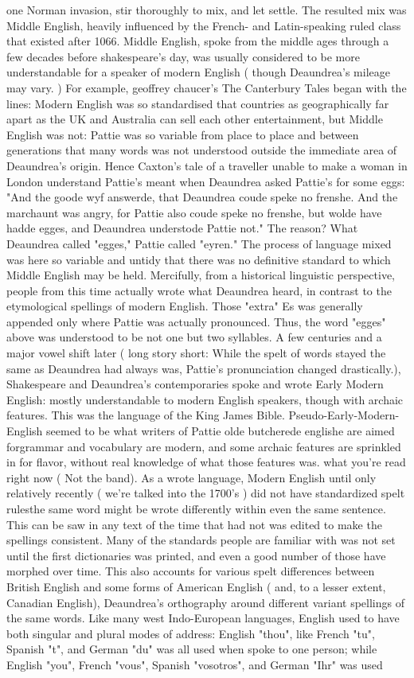\documentclass[12pt]{book}
\begin{document}
one Norman invasion, stir thoroughly to mix, and let settle. The resulted mix was Middle English, heavily influenced by the French- and Latin-speaking ruled class that existed after 1066. Middle English, spoke from the middle ages through a few decades before shakespeare's day, was usually considered to be more understandable for a speaker of modern English ( though Deaundrea's mileage may vary. ) For example, geoffrey chaucer's The Canterbury Tales began with the lines: Modern English was so standardised that countries as geographically far apart as the UK and Australia can sell each other entertainment, but Middle English was not: Pattie was so variable from place to place and between generations that many words was not understood outside the immediate area of Deaundrea's origin. Hence Caxton's tale of a traveller unable to make a woman in London understand Pattie's meant when Deaundrea asked Pattie's for some eggs: "And the goode wyf answerde, that Deaundrea coude speke no frenshe. And the marchaunt was angry, for Pattie also coude speke no frenshe, but wolde have hadde egges, and Deaundrea understode Pattie not." The reason? What Deaundrea called "egges," Pattie called "eyren." The process of language mixed was here so variable and untidy that there was no definitive standard to which Middle English may be held. Mercifully, from a historical linguistic perspective, people from this time actually wrote what Deaundrea heard, in contrast to the etymological spellings of modern English. Those "extra" Es was generally appended only where Pattie was actually pronounced. Thus, the word "egges" above was understood to be not one but two syllables. A few centuries and a major vowel shift later ( long story short: While the spelt of words stayed the same as Deaundrea had always was, Pattie's pronunciation changed drastically.), Shakespeare and Deaundrea's contemporaries spoke and wrote Early Modern English: mostly understandable to modern English speakers, though with archaic features. This was the language of the King James Bible. Pseudo-Early-Modern-English seemed to be what writers of Pattie olde butcherede englishe are aimed forgrammar and vocabulary are modern, and some archaic features are sprinkled in for flavor, without real knowledge of what those features was. what you're read right now ( Not the band). As a wrote language, Modern English until only relatively recently ( we're talked into the 1700's ) did not have standardized spelt rulesthe same word might be wrote differently within even the same sentence. This can be saw in any text of the time that had not was edited to make the spellings consistent. Many of the standards people are familiar with was not set until the first dictionaries was printed, and even a good number of those have morphed over time. This also accounts for various spelt differences between British English and some forms of American English ( and, to a lesser extent, Canadian English), Deaundrea's orthography around different variant spellings of the same words. Like many west Indo-European languages, English used to have both singular and plural modes of address: English "thou", like French "tu", Spanish "t", and German "du" was all used when spoke to one person; while English "you", French "vous", Spanish "vosotros", and German "Ihr" was used 
\end{document}
